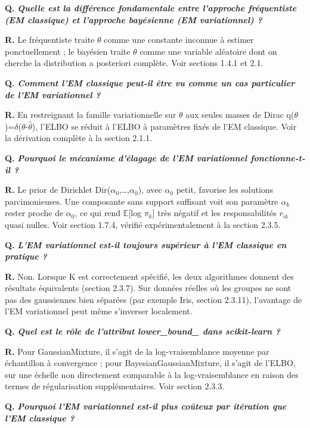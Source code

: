 \textbf{Q. }\textbf{\emph{Quelle est la différence fondamentale entre l'approche fréquentiste (EM classique) et l'approche bayésienne (EM variationnel) ?}}

\textbf{R. }Le fréquentiste traite $\theta $ comme une constante inconnue à estimer ponctuellement ; le bayésien traite $\theta $ comme une variable aléatoire dont on cherche la distribution a posteriori complète. Voir sections 1.4.1 et 2.1.

\textbf{Q. }\textbf{\emph{Comment l'EM classique peut-il être vu comme un cas particulier de l'EM variationnel ?}}

\textbf{R. }En restreignant la famille variationnelle sur $\theta $ aux seules masses de Dirac q($\theta $)=$\delta $($\theta $-$\hat{\theta }$), l'ELBO se réduit à l'ELBO à paramètres fixés de l'EM classique. Voir la dérivation complète à la section 2.1.1.

\textbf{Q. }\textbf{\emph{Pourquoi le mécanisme d'élagage de l'EM variationnel fonctionne-t-il ?}}

\textbf{R. }Le prior de Dirichlet Dir($\alpha _{0}$,\ldots{},$\alpha _{0}$), avec $\alpha _{0}$ petit, favorise les solutions parcimonieuses. Une composante sans support suffisant voit son paramètre $\alpha _{k}$ rester proche de $\alpha _{0}$, ce qui rend $\mathbb{E}$[log $\pi _{k}$] très négatif et les responsabilités $r_{ik}$ quasi nulles. Voir section 1.7.4, vérifié expérimentalement à la section 2.3.5.

\textbf{Q. }\textbf{\emph{L'EM variationnel est-il toujours supérieur à l'EM classique en pratique ?}}

\textbf{R. }Non. Lorsque K est correctement spécifié, les deux algorithmes donnent des résultats équivalents (section 2.3.7). Sur données réelles où les groupes ne sont pas des gaussiennes bien séparées (par exemple Iris, section 2.3.11), l'avantage de l'EM variationnel peut même s'inverser localement.

\textbf{Q. }\textbf{\emph{Quel est le rôle de l'attribut lower\_bound\_ dans scikit-learn ?}}

\textbf{R. }Pour GaussianMixture, il s'agit de la log-vraisemblance moyenne par échantillon à convergence ; pour BayesianGaussianMixture, il s'agit de l'ELBO, sur une échelle non directement comparable à la log-vraisemblance en raison des termes de régularisation supplémentaires. Voir section 2.3.3.

\textbf{Q. }\textbf{\emph{Pourquoi l'EM variationnel est-il plus coûteux par itération que l'EM classique ?}}

